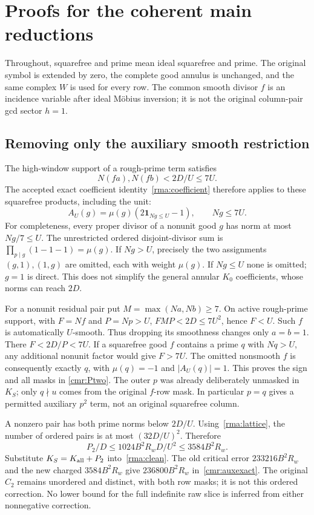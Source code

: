 \documentclass[11pt]{article}
\theoremstyle{definition}\newtheorem{definition}[theorem]{Definition}
\theoremstyle{remark}\newtheorem{remark}[theorem]{Remark}
\begin{document}
\section{Proofs for the coherent main reductions}\label{cmr:details}
Throughout, squarefree and prime mean ideal squarefree and prime.
The original symbol is extended by zero, the complete good annulus is
unchanged, and the same complex $W$ is used for every row. The common
smooth divisor $f$ is an incidence variable after ideal M\"obius
inversion; it is not the original column-pair gcd sector $h=1$.

\subsection{Removing only the auxiliary smooth restriction}
The high-window support of a rough-prime term satisfies
\[
 N(fa),N(fb)<2D/U\le7U.
\]
The accepted exact coefficient identity~\eqref{rma:coefficient} therefore
applies to these squarefree products, including the unit:
\begin{equation}\label{cmr:short-coefficient}
 A_U(g)=\mu(g)(2\mathbf1_{Ng\le U}-1),\qquad Ng\le7U.
\end{equation}
For completeness, every proper divisor of a nonunit good $g$ has norm
at most $Ng/7\le U$. The unrestricted ordered disjoint-divisor sum is
$\prod_{p\mid g}(1-1-1)=\mu(g)$. If $Ng>U$, precisely the two
assignments $(g,1),(1,g)$ are omitted, each with weight $\mu(g)$.
If $Ng\le U$ none is omitted; $g=1$ is direct. This does not simplify
the general annular $K_0$ coefficients, whose norms can reach $2D$.

For a nonunit residual pair put $M=\max(Na,Nb)\ge7$.
On active rough-prime support, with $F=Nf$ and $P=Np>U$,
$FMP<2D\le7U^2$, hence $F<U$. Such $f$ is automatically $U$-smooth.
Thus dropping its smoothness changes only $a=b=1$.
There $F<2D/P<7U$. If a squarefree good $f$ contains a prime $q$
with $Nq>U$, any additional nonunit factor would give $F>7U$.
The omitted nonsmooth $f$ is consequently exactly $q$, with
$\mu(q)=-1$ and $|A_U(q)|=1$. This proves the sign and all masks in
\eqref{cmr:Ptwo}. The outer $p$ was already deliberately unmasked in
$K_S$; only $q\nmid u$ comes from the original $f$-row mask.
In particular $p=q$ gives a permitted auxiliary $p^2$ term, not an
original squarefree column.

A nonzero pair has both prime norms below $2D/U$.
Using~\eqref{rma:lattice}, the number of ordered pairs is at most
$(32D/U)^2$. Therefore
\[
 P_2/D\le1024B^2R_w D/U^2\le3584B^2R_w.
\]
Substitute $K_S=K_{\rm all}+P_2$ into~\eqref{rma:clean}.
The old critical error $233216B^2R_w$ and the new charged
$3584B^2R_w$ give $236800B^2R_w$ in~\eqref{cmr:auxexact}.
The original $C_2$ remains unordered and distinct, with both row
masks; it is not this ordered correction. No lower bound for the full
indefinite raw slice is inferred from either nonnegative correction.
\end{document}
